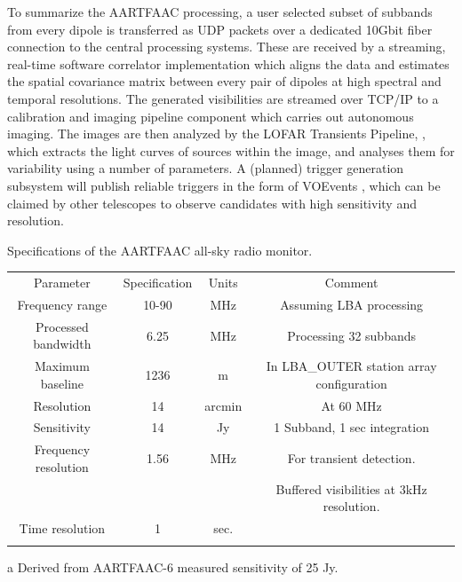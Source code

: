 \documentclass{ws-jai}
\begin{document}
To summarize  the AARTFAAC processing, a  user selected subset of  subbands from
every  dipole is  transferred  as  UDP packets  over  a  dedicated 10Gbit  fiber
connection  to  the  central  processing  systems.   These  are  received  by  a
streaming, real-time  software correlator  implementation which aligns  the data
and estimates  the spatial covariance  matrix between  every pair of  dipoles at
high spectral and temporal resolutions.  The generated visibilities are streamed
over TCP/IP  to a calibration and  imaging pipeline component which  carries out
autonomous  imaging.  The  images  are  then analyzed  by  the LOFAR  Transients
Pipeline, \citep[TraP;][]{swinbank2015lofar}, which extracts the light curves of
sources within  the image, and analyses  them for variability using  a number of
parameters.   A (planned)  trigger  generation subsystem  will publish  reliable
triggers  in  the form  of  VOEvents  \cite{williams2006voevent}, which  can  be
claimed  by other  telescopes to  observe candidates  with high  sensitivity and
resolution.



\begin{wstable}[h]
\caption{Specifications of the AARTFAAC all-sky radio monitor.}
\begin{tabular}{@{}cccc@{}} \toprule
Parameter & Specification & Units & Comment\\ \colrule
Frequency range & 10-90 & MHz & Assuming LBA processing  \\
Processed bandwidth & 6.25 & MHz & Processing 32 subbands \\
Maximum baseline & 1236 & m & In LBA\_OUTER station array configuration\\
Resolution & 14 & arcmin & At 60 MHz \\
Sensitivity & 14\tnote{a} & Jy & 1 Subband, 1 sec integration \\
Frequency resolution & 1.56 & MHz & For transient detection. \\
 & & & Buffered visibilities at 3kHz resolution.\\
Time resolution & 1 & sec.\\ \colrule

\end{tabular}
\begin{tablenotes}
\item[a] Derived from AARTFAAC-6 measured sensitivity of 25 Jy.
\end{tablenotes}
\label{tab:afaac_specs}
\end{wstable}
\end{document}
